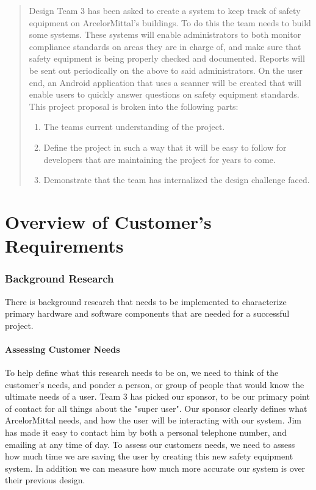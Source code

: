 \documentclass[Letter,11pt]{article}
\begin{document}
	
			\tableofcontents
			\listoffigures
			\begingroup
			\let\clearpage\relax
			\listoftables
			\endgroup
			\newpage
	\begin{abstract}
		Design Team 3 has been asked to create a system to keep track of safety equipment on ArcelorMittal's buildings. To do this the team needs to build some systems. These systems will enable administrators to both monitor compliance standards on areas they are in charge of, and make sure that safety equipment is being properly checked and documented. Reports will be sent out periodically on the above to said administrators.  On the user end, an Android application  that uses a scanner will be created that will enable users to quickly answer questions on safety equipment standards.  This project proposal is broken into the following parts:
		\begin{enumerate}
			\item The teams current understanding of the project.
			\item Define the project in such a way that it will be easy to follow for developers that are maintaining the project for years to come.
			\item Demonstrate that the team has internalized the design challenge faced.
		\end{enumerate}
	\end{abstract}
	

\part{Overview of Customer's Requirements}
\section{Background Research}\label{resarch}
	There is background research that needs to be implemented to characterize primary hardware and software components that are needed for a successful project. \\
	\subsection{Assessing Customer Needs}
	To help define what this research needs to be on, we need to think of the customer's needs, and ponder a person, or group of people that would know the ultimate needs of a user. Team 3 has picked our sponsor, to be our primary point of contact for all things about the "super user". Our sponsor clearly defines what ArcelorMittal needs, and how the user will be interacting with our system. Jim has made it easy to contact him by both a personal telephone number, and emailing at any time of day.  To assess our customers needs, we need to assess how much time we are saving the user by creating this new safety equipment system. In addition we can measure how much more accurate our system is over their previous design. \\ 
\end{document}
